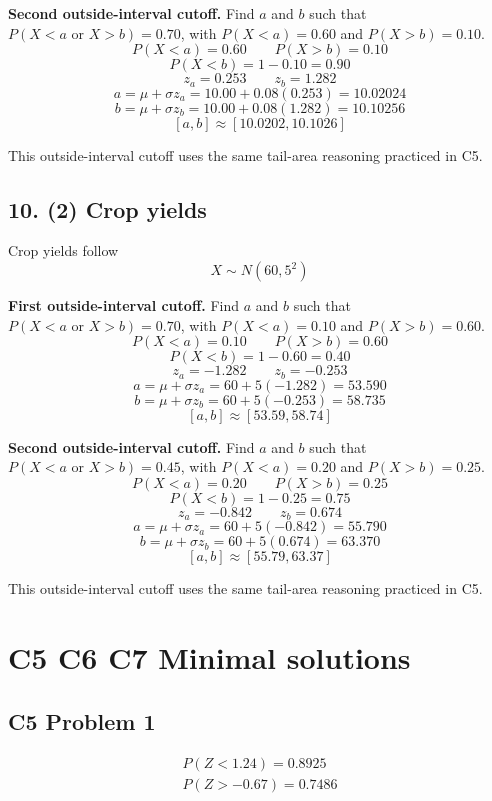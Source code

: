 	\textbf{Second outside-interval cutoff.} Find \(a\) and \(b\) such that \(P(X<a\text{ or }X>b)=0.70\), with \(P(X<a)=0.60\) and \(P(X>b)=0.10\).
	\[
	P(X<a)=0.60
	\qquad
	P(X>b)=0.10
	\]
	\[
	P(X<b)=1-0.10=0.90
	\]
	\[
	z_a=0.253
	\qquad
	z_b=1.282
	\]
	\[
	a=\mu+\sigma z_a
	=10.00+0.08(0.253)
	=10.02024
	\]
	\[
	b=\mu+\sigma z_b
	=10.00+0.08(1.282)
	=10.10256
	\]
	\[
	[a,b]\approx[10.0202,10.1026]
	\]
	
	This outside-interval cutoff uses the same tail-area reasoning practiced in C5.
	
	
	\subsection*{10. (2) Crop yields}
	\label{subsec:inverse-normal-problems-c7-10}
	Crop yields follow
	\[
	X\sim N(60,5^2)
	\]
	
	\textbf{First outside-interval cutoff.} Find \(a\) and \(b\) such that \(P(X<a\text{ or }X>b)=0.70\), with \(P(X<a)=0.10\) and \(P(X>b)=0.60\).
	\[
	P(X<a)=0.10
	\qquad
	P(X>b)=0.60
	\]
	\[
	P(X<b)=1-0.60=0.40
	\]
	\[
	z_a=-1.282
	\qquad
	z_b=-0.253
	\]
	\[
	a=\mu+\sigma z_a
	=60+5(-1.282)
	=53.590
	\]
	\[
	b=\mu+\sigma z_b
	=60+5(-0.253)
	=58.735
	\]
	\[
	[a,b]\approx[53.59,58.74]
	\]
	
	\textbf{Second outside-interval cutoff.} Find \(a\) and \(b\) such that \(P(X<a\text{ or }X>b)=0.45\), with \(P(X<a)=0.20\) and \(P(X>b)=0.25\).
	\[
	P(X<a)=0.20
	\qquad
	P(X>b)=0.25
	\]
	\[
	P(X<b)=1-0.25=0.75
	\]
	\[
	z_a=-0.842
	\qquad
	z_b=0.674
	\]
	\[
	a=\mu+\sigma z_a
	=60+5(-0.842)
	=55.790
	\]
	\[
	b=\mu+\sigma z_b
	=60+5(0.674)
	=63.370
	\]
	\[
	[a,b]\approx[55.79,63.37]
	\]
	
	This outside-interval cutoff uses the same tail-area reasoning practiced in C5.
	
	

	\section{C5 C6 C7 Minimal solutions}

	\subsection{C5 Problem 1}
	\[
	\begin{array}{l}
	P(Z<1.24)=0.8925\\
	P(Z>-0.67)=0.7486
	\end{array}
	\]

